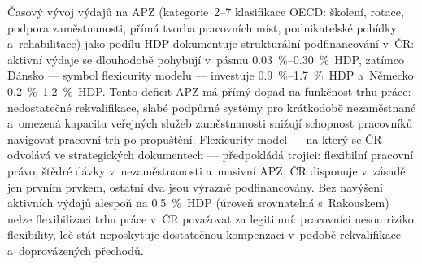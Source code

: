 Časový vývoj výdajů na \ac{APZ} (kategorie~2--7 klasifikace \acs{OECD}: školení, rotace, podpora zaměstnanosti, přímá tvorba pracovních míst, podnikatelské pobídky a~rehabilitace) jako podílu \ac{HDP} dokumentuje strukturální podfinancování v~ČR: aktivní výdaje se dlouhodobě pohybují v~pásmu \SIrange{0,03}{0,30}{\percent}~\ac{HDP}, zatímco Dánsko --- symbol flexicurity modelu --- investuje \SIrange{0,9}{1,7}{\percent}~\ac{HDP} a~Německo \SIrange{0,2}{1,2}{\percent}~\ac{HDP}.
Tento deficit \ac{APZ} má přímý dopad na funkčnost trhu práce: nedostatečné rekvalifikace, slabé podpůrné systémy pro krátkodobě nezaměstnané a~omezená kapacita veřejných služeb zaměstnanosti snižují schopnost pracovníků navigovat pracovní trh po propuštění.
Flexicurity model --- na který se ČR odvolává ve strategických dokumentech --- předpokládá trojici: flexibilní pracovní právo, štědré dávky v~nezaměstnanosti a~masivní \ac{APZ}; ČR disponuje v~zásadě jen prvním prvkem, ostatní dva jsou výrazně podfinancovány.
Bez navýšení aktivních výdajů alespoň na \SI{0,5}{\percent}~\ac{HDP} (úroveň srovnatelná s~Rakouskem) nelze flexibilizaci trhu práce v~ČR považovat za legitimní: pracovníci nesou riziko flexibility, leč stát neposkytuje dostatečnou kompenzaci v~podobě rekvalifikace a~doprovázených přechodů.


